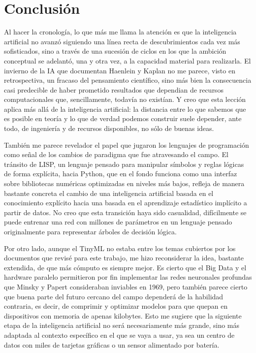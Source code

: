 \documentclass[12pt,letterpaper]{article}
\begin{document}
\section{Conclusi\'on}

Al hacer la cronolog\'ia, lo que m\'as me llama la atenci\'on es que la inteligencia artificial no avanz\'o siguiendo una l\'inea recta de descubrimientos cada vez m\'as sofisticados, sino a trav\'es de una sucesi\'on de ciclos en los que la ambici\'on conceptual se adelant\'o, una y otra vez, a la capacidad material para realizarla. El invierno de la IA que documentan Haenlein y Kaplan no me parece, visto en retrospectiva, un fracaso del pensamiento cient\'ifico, sino m\'as bien la consecuencia casi predecible de haber prometido resultados que dependian de recursos computacionales que, sencillamente, todav\'ia no exist\'ian. Y creo que esta lecci\'on aplica m\'as all\'a de la inteligencia artificial: la distancia entre lo que sabemos que es posible en teor\'ia y lo que de verdad podemos construir suele depender, ante todo, de ingenier\'ia y de recursos disponibles, no s\'olo de buenas ideas.

Tambi\'en me parece revelador el papel que jugaron los lenguajes de programaci\'on como se\~nal de los cambios de paradigma que fue atravesando el campo. El tr\'ansito de LISP, un lenguaje pensado para manipular s\'imbolos y reglas l\'ogicas de forma expl\'icita, hacia Python, que en el fondo funciona como una interfaz sobre bibliotecas num\'ericas optimizadas en niveles m\'as bajos, refleja de manera bastante concreta el cambio de una inteligencia artificial basada en el conocimiento expl\'icito hacia una basada en el aprendizaje estad\'istico impl\'icito a partir de datos. No creo que esta transici\'on haya sido casualidad, dif\'icilmente se puede entrenar una red con millones de par\'ametros en un lenguaje pensado originalmente para representar \'arboles de decisi\'on l\'ogica.

Por otro lado, aunque el TinyML no estaba entre los temas cubiertos por los documentos que revis\'e para este trabajo, me hizo reconsiderar la idea, bastante extendida, de que m\'as c\'omputo es siempre mejor. Es cierto que el Big Data y el hardware paralelo permitieron por fin implementar las redes neuronales profundas que Minsky y Papert consideraban inviables en 1969, pero tambi\'en parece cierto que buena parte del futuro cercano del campo depender\'a de la habilidad contraria, es decir, de comprimir y optimizar modelos para que quepan en dispositivos con memoria de apenas kilobytes. Esto me sugiere que la siguiente etapa de la inteligencia artificial no ser\'a necesariamente m\'as grande, sino m\'as adaptada al contexto espec\'ifico en el que se vaya a usar, ya sea un centro de datos con miles de tarjetas gr\'aficas o un sensor alimentado por bater\'ia.
\end{document}
